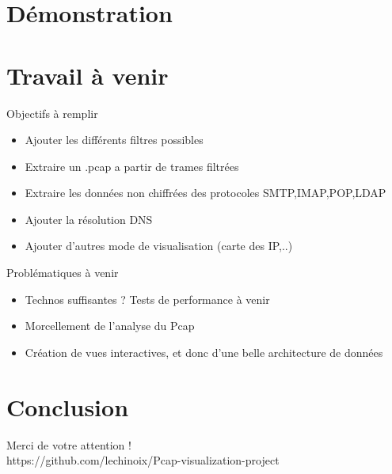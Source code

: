 \documentclass{beamer}
\begin{document}
  
 \section{Démonstration}


  \section{Travail à venir}  
  \begin{frame}
    Objectifs à remplir
    \begin{itemize}
     \item Ajouter les différents filtres possibles
     \item Extraire un .pcap a partir de trames filtrées
     \item Extraire les données non chiffrées des protocoles SMTP,IMAP,POP,LDAP
     \item Ajouter la résolution DNS
     \item Ajouter d'autres mode de visualisation (carte des IP,..)
    \end{itemize}
  \end{frame}

  \begin{frame}
    Problématiques à venir
    \begin{itemize}
     \item Technos suffisantes ? Tests de performance à venir
     \item Morcellement de l'analyse du Pcap
     \item Création de vues interactives, et donc d'une belle architecture de
     données
     \end{itemize}
  \end{frame}
  
  \section{Conclusion}
  \begin{frame}
    \begin{center}
      Merci de votre attention ! \\
      https://github.com/lechinoix/Pcap-visualization-project
    \end{center}
  \end{frame}
  
\end{document}
